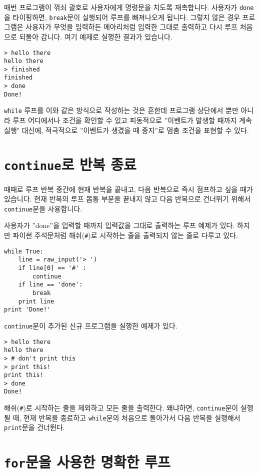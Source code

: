 매번 프로그램이 꺾쇠 괄호로 사용자에게 명령문을 치도록 재촉합니다. 사용자가 {\tt done}을 타이핑하면, 
{\tt break}문이 실행되어 루프를 빠져나오게 됩니다. 그렇지 않은 경우 프로그램은 사용자가 무엇을 입력하든 메아리처럼 입력한 그대로 출력하고
다시 루프 처음으로 되돌아 갑니다. 여기 예제로 실행한 결과가 있습니다.

\beforeverb
\begin{verbatim}
> hello there
hello there
> finished
finished
> done
Done!
\end{verbatim}
\afterverb
%

{\tt while} 루프를 이와 같은 방식으로 작성하는 것은 흔한데 프로그램 상단에서 뿐만 아니라
루프 어디에서나 조건을 확인할 수 있고 피동적으로 ''이벤트가 발생할 때까지 계속 실행" 대신에, 적극적으로 ''이벤트가 생겼을 때 중지''로 멈춤 조건을 표현할 수 있다.


\section{{\tt continue}로 반복 종료}

때때로 루프 반복 중간에 현재 반복을 끝내고, 다음 반복으로 즉시 점프하고 싶을 때가 있습니다.
현재 반복의 루프 몸통 부분을 끝내지 않고 다음 반복으로 건너뛰기 위해서 {\tt continue}문을 사용합니다.

사용자가 ''done''을 입력할 때까지 입력값을 그대로 출력하는 루프 예제가 있다. 하지만 파이썬 주석문처럼
해쉬(\verb"#")로 시작하는 줄을 출력되지 않는 줄로 다루고 있다.

\beforeverb
\begin{verbatim}
while True:
    line = raw_input('> ')
    if line[0] == '#' :
        continue
    if line == 'done':
        break
    print line
print 'Done!'
\end{verbatim}
\afterverb
%

{\tt continue}문이 추가된 신규 프로그램을 실행한 예제가 있다.

\beforeverb
\begin{verbatim}
> hello there
hello there
> # don't print this
> print this!
print this!
> done
Done!
\end{verbatim}
\afterverb
%

해쉬(\verb"#")로 시작하는 줄을 제외하고 모든 줄을 출력한다. 왜냐하면, {\tt continue}문이 실행될 때,
현재 반복을 종료하고 {\tt while}문의 처음으로 돌아가서 다음 반복을 실행해서 {\tt print}문을 건너뛴다.


\section{{\tt for}문을 사용한 명확한 루프 }

